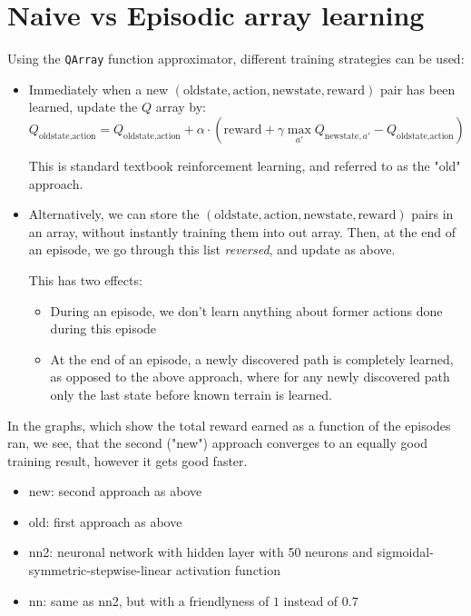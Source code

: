 \documentclass[ngerman]{scrartcl} %
\begin{document}
\section{Naive vs Episodic array learning}
Using the \verb+QArray+ function approximator, different training strategies can be used:

\begin{itemize}
\item Immediately when a new $(\text{oldstate}, \text{action}, \text{newstate}, \text{reward})$ pair has been learned,
	update the $Q$ array by:
	$$Q_{\text{oldstate},\text{action}} = Q_{\text{oldstate},\text{action}} + \alpha \cdot (\text{reward} + \gamma \max_{a'} Q_{\text{newstate},{a'}} - Q_{\text{oldstate},\text{action}})$$

	This is standard textbook reinforcement learning, and referred to as the "old" approach.

\item Alternatively, we can store the $(\text{oldstate}, \text{action}, \text{newstate}, \text{reward})$ pairs in an array,
	without instantly training them into out array. Then, at the end of an episode, we go through this list \emph{reversed}, and update as above.

	This has two effects:
	\begin{itemize}
	\item During an episode, we don't learn anything about former actions done during this episode
	\item At the end of an episode, a newly discovered path is completely learned, as opposed to the above approach, where for any newly discovered path only the last state before known terrain is learned.
	\end{itemize}
\end{itemize}

In the graphs, which show the total reward earned as a function of the episodes ran, we see, that the second ("new") approach converges to an equally good training result, however it gets good faster.

\begin{itemize}
	\item new: second approach as above
	\item old: first approach as above
	\item nn2: neuronal network with hidden layer with 50 neurons and sigmoidal-symmetric-stepwise-linear activation function
	\item nn: same as nn2, but with a friendlyness of $1$ instead of $0.7$
\end{itemize}
\end{document}
